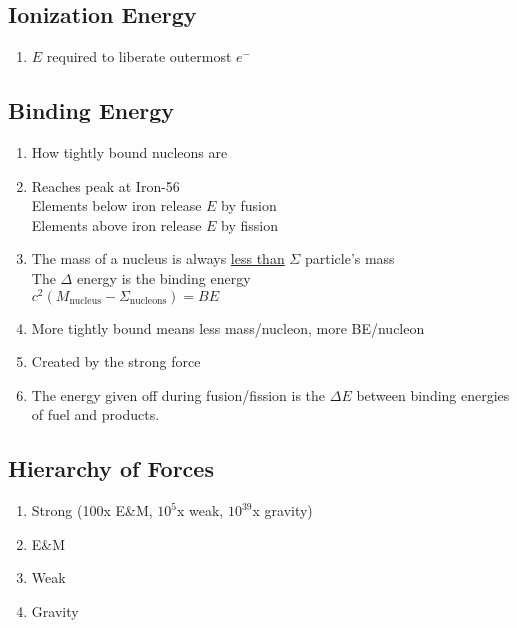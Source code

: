 \documentclass[10pt,a4paper]{article}
\begin{document}
\subsection{Ionization Energy}
\begin{enumerate}
    \item $E$ required to liberate outermost $e^-$
\end{enumerate}

\subsection{Binding Energy}
\begin{enumerate}
    \item How tightly bound nucleons are
    \item Reaches peak at Iron-56\\
        Elements below iron release $E$ by fusion\\
        Elements above iron release $E$ by fission\\
    \item The mass of a nucleus is always \underline{less than} $\Sigma$ particle's mass\\
        The $\Delta$ energy is the binding energy\\
        $c^2(M_{\textrm{nucleus}}-\Sigma_{\textrm{nucleons}}) = BE$
    \item More tightly bound means less mass/nucleon, more BE/nucleon
    \item Created by the strong force
    \item The energy given off during fusion/fission is the $\Delta E$ between binding energies of fuel and products.
\end{enumerate}

\subsection{Hierarchy of Forces}
\begin{enumerate}
    \item Strong (100x E\&M, $10^5$x weak, $10^{39}$x gravity)
    \item E\&M
    \item Weak
    \item Gravity
\end{enumerate}
\end{document}
